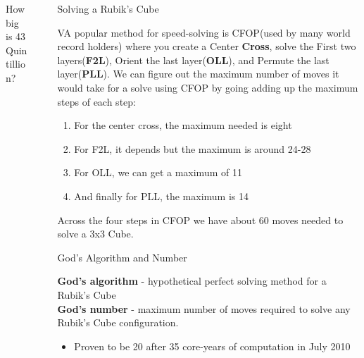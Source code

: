 \documentclass[final]{beamer}
\newlength{\sepwidth}
\newlength{\colwidth}
\newcommand{\separatorcolumn}{\begin{column}{\sepwidth}\end{column}}
\begin{document}
\begin{frame}[t]
\begin{columns}[t]
\begin{column}{\colwidth}
\begin{block}{How big is 43 Quintillion?}
  \end{block}

\end{column}

\separatorcolumn

\begin{column}{\colwidth}

  \begin{block}{Solving a Rubik's Cube}

    \large VA popular method for speed-solving is CFOP(used by many world record holders) where you create a Center \textbf{Cross}, solve the First two layers(\textbf{F2L}), Orient the last layer(\textbf{OLL}), and Permute the last layer(\textbf{PLL}). 
    We can figure out the maximum number of moves it would take for a solve using CFOP by going adding up the maximum steps of each step: 
    \begin{enumerate}
      \item For the center cross, the maximum needed is eight
      \item For F2L, it depends but the maximum is around 24-28
      \item For OLL, we can get a maximum of 11
      \item And finally for PLL, the maximum is 14
    \end{enumerate}
    Across the four steps in CFOP we have about 60 moves needed to solve a 3x3 Cube.

  \end{block}

  \begin{block}{God's Algorithm and Number}

    \textbf{God's algorithm} - hypothetical perfect solving method for a Rubik's Cube  \\
    \textbf{God's number} - maximum number of moves required to solve any Rubik's Cube configuration. \\
    \begin{itemize}
      \item Proven to be 20 after 35 core-years of computation in July 2010
    \end{itemize}


\end{block}
\end{column}
\end{columns}
\end{frame}
\end{document}
